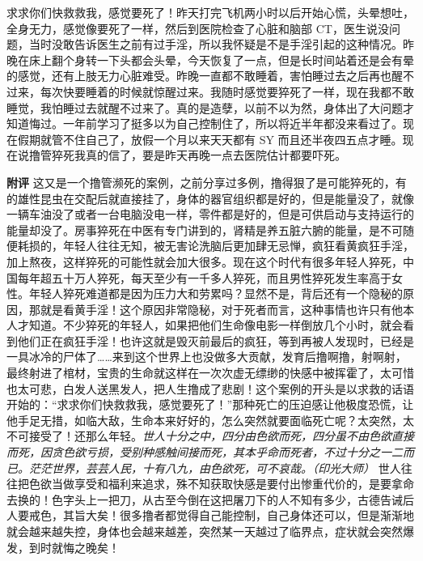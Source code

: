 \begin{case}
    求求你们快救救我，感觉要死了！昨天打完飞机两小时以后开始心慌，头晕想吐，全身无力，感觉像要死了一样，然后到医院检查了心脏和脑部 CT，医生说没问题，当时没敢告诉医生之前有过手淫，所以我怀疑是不是手淫引起的这种情况。昨晚在床上翻个身转一下头都会头晕，今天恢复了一点，但是长时间站着还是会有晕的感觉，还有上肢无力心脏难受。昨晚一直都不敢睡着，害怕睡过去之后再也醒不过来，每次快要睡着的时候就惊醒过来。我随时感觉要猝死了一样，现在我都不敢睡觉，我怕睡过去就醒不过来了。真的是造孽，以前不以为然，身体出了大问题才知道悔过。一年前学习了挺多以为自己控制住了，所以将近半年都没来看过了。现在假期就管不住自己了，放假一个月以来天天都有 SY 而且还半夜四五点才睡。现在说撸管猝死我真的信了，要是昨天再晚一点去医院估计都要吓死。

    \textbf{附评} 这又是一个撸管濒死的案例，之前分享过多例，撸得狠了是可能猝死的，有的雄性昆虫在交配后就直接挂了，身体的器官组织都是好的，但是能量没了，就像一辆车油没了或者一台电脑没电一样，零件都是好的，但是可供启动与支持运行的能量却没了。房事猝死在中医有专门讲到的，肾精是养五脏六腑的能量，是不可随便耗损的，年轻人往往无知，被无害论洗脑后更加肆无忌惮，疯狂看黄疯狂手淫，加上熬夜，这样猝死的可能性就会加大很多。现在这个时代有很多年轻人猝死，中国每年超五十万人猝死，每天至少有一千多人猝死，而且男性猝死发生率高于女性。年轻人猝死难道都是因为压力大和劳累吗？显然不是，背后还有一个隐秘的原因，那就是看黄手淫！这个原因非常隐秘，对于死者而言，这种事情也许只有他本人才知道。不少猝死的年轻人，如果把他们生命像电影一样倒放几个小时，就会看到他们正在疯狂手淫！也许这就是毁灭前最后的疯狂，等到再被人发现时，已经是一具冰冷的尸体了……来到这个世界上也没做多大贡献，发育后撸啊撸，射啊射，最终射进了棺材，宝贵的生命就这样在一次次虚无缥缈的快感中被挥霍了，太可惜也太可悲，白发人送黑发人，把人生撸成了悲剧！这个案例的开头是以求救的话语开始的：“求求你们快救救我，感觉要死了！”那种死亡的压迫感让他极度恐慌，让他手足无措，如临大敌，生命本来好好的，怎么突然就要面临死亡呢？太突然，太不可接受了！还那么年轻。\textit{世人十分之中，四分由色欲而死，四分虽不由色欲直接而死，因贪色欲亏损，受别种感触间接而死，其本乎命而死者，不过十分之一二而已。茫茫世界，芸芸人民，十有八九，由色欲死，可不哀哉。（印光大师）} 世人往往把色欲当做享受和福利来追求，殊不知获取快感是要付出惨重代价的，是要拿命去换的！色字头上一把刀，从古至今倒在这把屠刀下的人不知有多少，古德告诫后人要戒色，其旨大矣！很多撸者都觉得自己能控制，自己身体还可以，但是渐渐地就会越来越失控，身体也会越来越差，突然某一天越过了临界点，症状就会突然爆发，到时就悔之晚矣！
\end{case}

